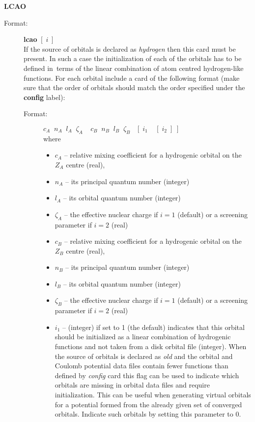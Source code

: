 \documentclass[10pt,a4paper]{article}
\begin{document}
\begin{description}
\item \textbf{LCAO}
\begin{description}
\item[Format:] \textbf{lcao} $[\;i\;]$\\ If the source of orbitals is declared as
  \textsl{hydrogen} then this card must be present. In such a case the initialization of
  each of the orbitals has to be defined in~terms of the linear combination of atom
  centred hydrogen-like functions. For each orbital include a card of the following format
  (make sure that the order of orbitals should match the order specified under the
  \textbf{config} label):

\begin{description}
\item[Format:] $c_A\;\;n_A \;\;l_A \;\;\zeta_A \;\;\;\;c_B\;\;n_B\;\;l_B\;\;
  \zeta_B\;\;\;[\;i_1\;\;\;\;[\;i_2\;]\;]$ \\
where
\begin{itemize}
\item[] $c_A$ -- relative mixing coefficient for a hydrogenic orbital on the
                    $Z_A$ centre (real),
\item[] $n_A$ -- its principal quantum number (integer)
\item[] $l_A$ -- its orbital quantum number (integer)
\item[] $\zeta_A$ -- the effective nuclear charge if $i=1$ (default) or
a screening parameter if $i=2$ (real)
\item[] $c_B$  -- relative mixing coefficient for a hydrogenic orbital on the
                    $Z_B$ centre (real),
\item[] $n_B$ -- its principal quantum number (integer)
\item[] $l_B$ -- its orbital quantum number (integer)
\item[] $\zeta_B$ -- the effective nuclear charge if $i=1$ (default) or
a screening parameter if $i=2$ (real)
\item[] $i_1$ -- (integer) if set to 1 (the default) indicates that this
  orbital should be initialized as a linear combination of hydrogenic
  functions and not taken from a disk orbital file (integer).
  When the source of orbitals is declared as \textsl{old} and the
  orbital and Coulomb potential data files contain fewer functions than
  defined by \textsl{config} card this flag can be used to indicate which
  orbitals are missing in orbital data files and require
  initialization. This can be useful when generating virtual orbitals for a
  potential formed from the already given set of converged orbitals. Indicate
  such orbitals by setting this parameter to 0.


\end{itemize}
\end{description}
\end{description}
\end{description}
\end{document}
